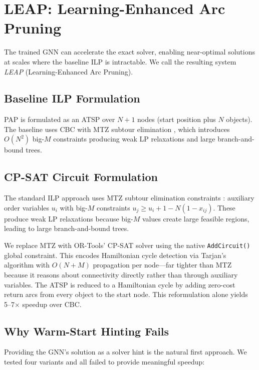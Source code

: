 \documentclass[conference]{IEEEtran}
\begin{document}
\section{LEAP: Learning-Enhanced Arc Pruning}\label{sec:ilp_accel}

The trained GNN can accelerate the exact solver, enabling near-optimal solutions at scales where the baseline ILP is intractable. We call the resulting system \emph{LEAP} (Learning-Enhanced Arc Pruning).

\subsection{Baseline ILP Formulation}

PAP is formulated as an ATSP over $N{+}1$ nodes (start position plus $N$ objects). The baseline uses CBC \cite{ortools} with MTZ subtour elimination \cite{mtz1960}, which introduces $O(N^2)$ big-$M$ constraints producing weak LP relaxations and large branch-and-bound trees.

\subsection{CP-SAT Circuit Formulation}

The standard ILP approach uses MTZ subtour elimination constraints \cite{mtz1960}: auxiliary order variables $u_i$ with big-$M$ constraints $u_j \geq u_i + 1 - N(1 - x_{ij})$. These produce weak LP relaxations because big-$M$ values create large feasible regions, leading to large branch-and-bound trees.

We replace MTZ with OR-Tools' CP-SAT solver using the native \texttt{AddCircuit()} global constraint. This encodes Hamiltonian cycle detection via Tarjan's algorithm with $O(N{+}M)$ propagation per node---far tighter than MTZ because it reasons about connectivity directly rather than through auxiliary variables. The ATSP is reduced to a Hamiltonian cycle by adding zero-cost return arcs from every object to the start node. This reformulation alone yields 5--7$\times$ speedup over CBC.

\subsection{Why Warm-Start Hinting Fails}\label{sec:hint_fail}

Providing the GNN's solution as a solver hint is the natural first approach. We tested four variants and all failed to provide meaningful speedup:
\end{document}
